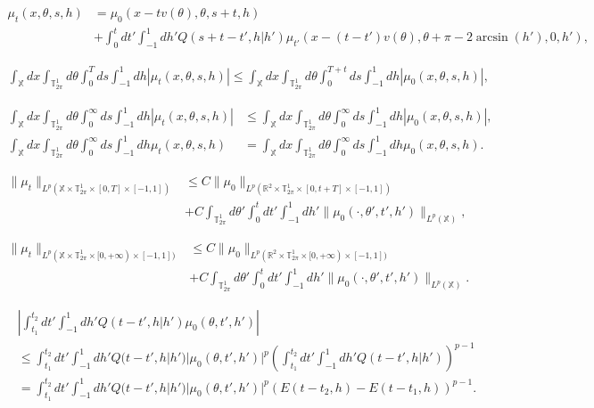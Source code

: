 \documentclass[10pt,a4paper]{amsart}
\begin{document}
{\footnotesize\begin{align}
\nonumber\mu_t(x,\theta,s,h)&=\mu_0(x-tv(\theta),\theta,s+t,h)
\\
\label{rapp:ev}&+\int_0^tdt'\int_{-1}^1dh'Q(s+t-t',h|h')\mu_{t'}(x-(t-t')v(\theta),\theta+\pi-2\arcsin(h'),0,h'),
\end{align}}

{\small\begin{align}\label{mutL1cpt}
\int_{\mathbb{X}}dx\int_{\mathbb{T}^1_{2\pi}}d\theta\int_0^Tds\int_{-1}^1dh|\mu_t(x,\theta,s,h)|\leq\int_{\mathbb{X}}dx\int_{\mathbb{T}^1_{2\pi}}d\theta\int_0^{T+t}ds\int_{-1}^1dh|\mu_0(x,\theta,s,h)|,
\end{align}}

{\small\begin{align}
\label{distanzadecr}\int_{\mathbb{X}}dx\int_{\mathbb{T}^1_{2\pi}}d\theta\int_0^{\infty}ds\int_{-1}^1dh|\mu_t(x,\theta,s,h)|&\leq\int_{\mathbb{X}}dx\int_{\mathbb{T}^1_{2\pi}}d\theta\int_0^{\infty}ds\int_{-1}^1dh|\mu_0(x,\theta,s,h)|,
\\
\label{consmassa}\int_{\mathbb{X}}dx\int_{\mathbb{T}^1_{2\pi}}d\theta\int_0^{\infty}ds\int_{-1}^1dh\mu_t(x,\theta,s,h)&=\int_{\mathbb{X}}dx\int_{\mathbb{T}^1_{2\pi}}d\theta\int_0^{\infty}ds\int_{-1}^1dh\mu_0(x,\theta,s,h).
\end{align}}

\begin{align}
\nonumber\|\mu_t\|_{L^p(\mathbb{X}\times\mathbb{T}^1_{2\pi}\times[0,T]\times[-1,1])}&\leq C\|\mu_0\|_{L^p(\mathbb{R}^2\times\mathbb{T}^1_{2\pi}\times[0,t+T]\times[-1,1])}
\\
\label{normaLp}&+C\int_{\mathbb{T}^1_{2\pi}}d\theta'\int_0^tdt'\int_{-1}^1dh'\|\mu_0(\cdot,\theta',t',h')\|_{L^p(\mathbb{X})},
\end{align}

\begin{align}
\nonumber\|\mu_t\|_{L^p(\mathbb{X}\times\mathbb{T}^1_{2\pi}\times[0,+\infty)\times[-1,1])}&\leq C\|\mu_0\|_{L^p(\mathbb{R}^2\times\mathbb{T}^1_{2\pi}\times[0,+\infty)\times[-1,1])}
\\
\label{normaLpfinita}&+C\int_{\mathbb{T}^1_{2\pi}}d\theta'\int_0^tdt'\int_{-1}^1dh'\|\mu_0(\cdot,\theta',t',h')\|_{L^p(\mathbb{X})}.
\end{align}

{\small\begin{align}
\nonumber&\left|\int_{t_1}^{t_2}dt'\int_{-1}^1dh'Q(t-t',h|h')\mu_0(\theta,t',h')\right|
\\
\nonumber&\leq\int_{t_1}^{t_2}dt'\int_{-1}^1dh'Q(t-t',h|h')|\mu_0(\theta,t',h')|^p\left(\int_{t_1}^{t_2}dt'\int_{-1}^1dh'Q(t-t',h|h')\right)^{p-1}
\\
\label{Jensencons}&=\int_{t_1}^{t_2}dt'\int_{-1}^1dh'Q(t-t',h|h')|\mu_0(\theta,t',h')|^p\left(E(t-t_2,h)-E(t-t_1,h)\right)^{p-1}.
\end{align}}
\end{document}
